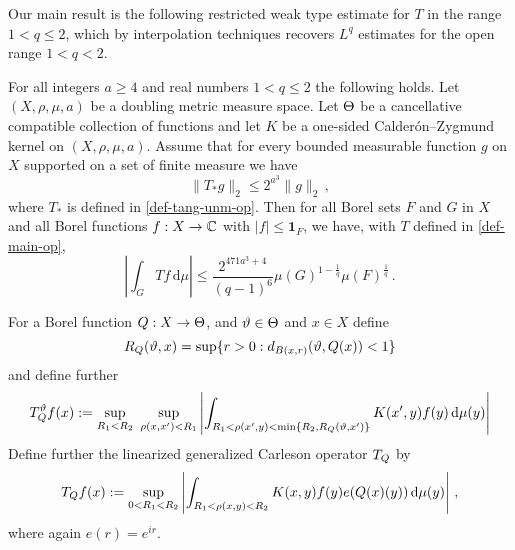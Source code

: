 Our main result is the following restricted weak type estimate for $T$ in the range $1<q\le 2$,
which by interpolation techniques recovers $L^q$ estimates for the open range $1<q<2$.
\begin{theorem}
\label{metric-space-Carleson}
\leanok
{}
    For all integers $a \ge 4$ and real numbers $1<q\le 2$ the following holds.
    Let $(X,\rho,\mu,a)$ be a doubling metric measure space.
    Let ${\Theta}$ be a cancellative compatible collection of functions and let $K$ be a one-sided Calder\'on--Zygmund kernel on $(X,\rho,\mu,a)$. Assume that for every bounded measurable function $g$ on $X$ supported on a set of finite measure we have
    \begin{equation}\label{nontanbound}
        \|T_{*}g\|_{2} \leq 2^{a^3} \|g\|_2\,,
    \end{equation}
    where $T_{*}$ is defined in \eqref{def-tang-unm-op}.
    Then for all Borel sets $F$ and $G$ in $X$ and all Borel functions $f:X\to \mathbb{C}$ with
    $|f|\le \mathbf{1}_F$, we have, with $T$ defined in \eqref{def-main-op},
    \begin{equation}
        \label{resweak}
        \left|\int_{G} T f \, \mathrm{d}\mu\right| \leq \frac{2^{471a^3+4}}{(q-1)^6} \mu(G)^{1-\frac{1}{q}} \mu(F)^{\frac{1}{q}}\, .
    \end{equation}
\end{theorem}

For a Borel function ${Q}:X\to {\Theta}$, and ${\vartheta} \in {\Theta}$ and $x\in X$ define
\begin{equation}
    R_{{Q}}({\vartheta},x)=\sup\{r>0:d_{B(x,r)}({\vartheta}, {Q}(x))<1\}
\end{equation}
and define further
\begin{equation}
    \label{def-lin-star-op}
    T_{{Q}}^{\vartheta} f(x):=\sup_{R_1<R_2} \ \sup_{\rho(x,x')<R_1}
    \left|\int_{R_1< \rho(x',y) < \min\{R_2, R_{{Q}}({\vartheta},x')\}} K(x',y) f(y) \, \mathrm{d}\mu(y) \right|
\end{equation}
Define further the linearized generalized Carleson operator $T_{Q}$ by
\begin{equation}
    \label{def-lin-main-op}
    T_{Q} f(x):= \sup_{0 < R_1 < R_2}\left| \int_{R_1 < \rho(x,y) < R_2} K(x,y) f(y) e({Q}(x)(y)) \, \mathrm{d}\mu(y) \right|\, ,
\end{equation}
where again $e(r)=e^{ir}$.

